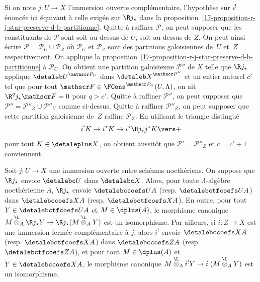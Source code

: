 \documentclass[10pt]{../fichiers-configuration-latex/smfart}
\begin{document}
Si on note $j\colon U \to X$ l'immersion ouverte complémentaire,
l'hypothèse sur $i^!$ énoncée ici équivaut à celle exigée sur
$\R j_\star$ dans la
proposition~\ref{17-proposition-r-j-star-preserve-d-b-partitionne}. Quitte à
raffiner $\mathscr P$, on peut supposer que les constituants de $\mathscr
P$ sont soit au-dessus de $U$, soit au-dessus de $Z$. On peut ainsi écrire
$\mathscr P=\mathscr P_U\cup \mathscr P_Z$ où $\mathscr P_U$ et $\mathscr
P_Z$ sont des partitions galoisiennes de $U$ et $Z$ respectivement. On
applique la proposition~\ref{17-proposition-r-j-star-preserve-d-b-partitionne}
à $\mathscr P_U$. On obtient une partition galoisienne $\mathscr P''$ de
$X$ telle que $\R j_\star $ applique ${\detaleb U}^{\mathscr
P_U}$ dans ${\detaleb X}^{\mathscr P''}$ et un entier naturel  $c'$
tel que pour tout
$\mathscr F\in\FCons^{\mathscr P_U}(U,\Lambda)$, on ait $\R^q j_\star
\mathscr F=0$  pour $q>c'$. Quitte à raffiner $\mathscr P''$, on peut
supposer que $\mathscr P''=\mathscr P''_Z\cup \mathscr P''_U$ comme
ci-dessus. Quitte à raffiner $\mathscr P''_Z$, on peut supposer que cette
partition galoisienne de $Z$ raffine $\mathscr P_Z$. En utilisant le
triangle distingué
\[i^!K\to i^\star K\to i^\star\R j_\star j^\star K\vers +\]
pour tout $K\in\detaleplus X$, on obtient aussitôt que $\mathscr P'=\mathscr
P''_Z$ et $c=c'+1$ conviennent.

\begin{proposition2}\label{17-proposition-r-j-star-preserve-d-b-ctf-coefficients}
Soit $j\colon U\to X$ une immersion ouverte entre schémas noethériens. On
suppose que $\R j_\star$ envoie $\detalebc U$ dans $\detalebc X$. Alors, pour
toute $\Lambda$-algèbre noethérienne $A$, $\R j_\star$ envoie
$\detalebccoefs U A$ (resp. $\detalebctfcoefs U A$)
dans $\detalebccoefs X A$ (resp. $\detalebctfcoefs X A$).
En outre, pour tout $Y\in\detalebctfcoefs U A$ et $M\in\dplus(A)$, le morphisme
canonique $M\overset{\L}\otimes_A \R j_\star Y\to \R
j_\star (M\overset{\L}\otimes_A Y)$ est un isomorphisme.
Par ailleurs, si $i\colon Z \to X$ est une immersion fermée complémentaire
à $j$, alors $i^!$ envoie $\detalebccoefs X A$ (resp. $\detalebctfcoefs X A$) dans
$\detalebccoefs Z A$ (resp. $\detalebctfcoefs Z A$), et pour tout
$M\in\dplus(A)$
et $Y\in\detalebccoefs X A$, le morphisme canonique
$M\overset{\L}\otimes_A i^!Y\to i^!(M\overset{\L}\otimes_A Y)$
est un isomorphisme.
\end{proposition2}
\end{document}

